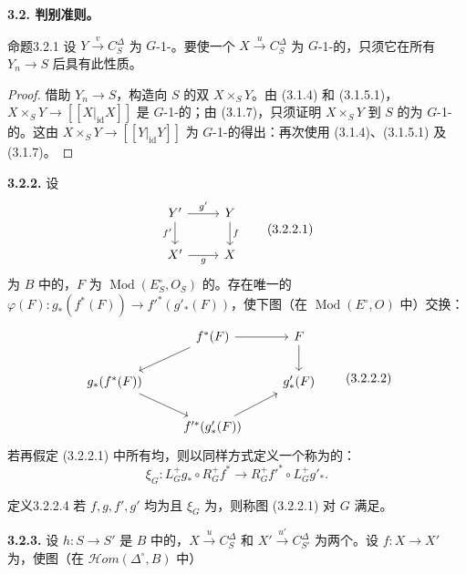 \textbf{3.2. 判别准则。}
\begin{SGAresult}{命题}{3.2.1}
设 $Y\xrightarrow{v}C_S^\Delta$ 为 $G$-1-。要使一个 $X\xrightarrow{u}C_S^\Delta$ 为 $G$-1-的，只须它在所有 $Y_n\to S$ 后具有此性质。
\end{SGAresult}
\begin{proof}
借助 $Y_n\to S$，构造向 $S$ 的双 $X\times_S Y$。由 (3.1.4) 和 (3.1.5.1)， $X\times_S Y\to[[X|_{\mathrm{id}}X]]$ 是 $G$-1-的；由 (3.1.7)，只须证明 $X\times_S Y$ 到 $S$ 的为 $G$-1-的。这由 $X\times_S Y\to[[Y|_{\mathrm{id}}Y]]$ 为 $G$-1-的得出：再次使用 (3.1.4)、(3.1.5.1) 及 (3.1.7)。
\end{proof}
\textbf{3.2.2.} 设
\[
\begin{tikzcd}
Y'\arrow[r,"g'"]\arrow[d,"f'"']&Y\arrow[d,"f"]\\
X'\arrow[r,"g"']&X
\end{tikzcd}\tag{3.2.2.1}
\]
为 $B$ 中的，$F$ 为 $\operatorname{Mod}(E_S^\circ,O_S)$ 的。存在唯一的
$\varphi(F):g_*(f^*(F))\to f'^*(g'_*(F))$，使下图（在 $\operatorname{Mod}(E^\circ,O)$ 中）交换：
\[
\begin{tikzcd}
&f^*(F)\arrow[r]\arrow[dl]&F\arrow[d]\\
g_*(f^*(F))\arrow[dr]&&g'_*(F)\\
&f'^*(g'_*(F))\arrow[ur]&
\end{tikzcd}\tag{3.2.2.2}
\]
若再假定 (3.2.2.1) 中所有均，则以同样方式定义一个称为的：
\[
\xi_G:L_G^+g_*\circ R_G^+f^*\longrightarrow
R_G^+f'^*\circ L_G^+g'_* . \tag{3.2.2.3}
\]
\begin{SGAresult}{定义}{3.2.2.4}
若 $f,g,f',g'$ 均为且 $\xi_G$ 为，则称图 (3.2.2.1) 对 $G$ 满足。
\end{SGAresult}
\textbf{3.2.3.} 设 $h:S\to S'$ 是 $B$ 中的，$X\xrightarrow{u}C_S^\Delta$ 和 $X'\xrightarrow{u'}C_{S'}^\Delta$ 为两个。设 $f:X\to X'$ 为，使图（在 $\mathcal{H}om(\Delta^\circ,B)$ 中）
